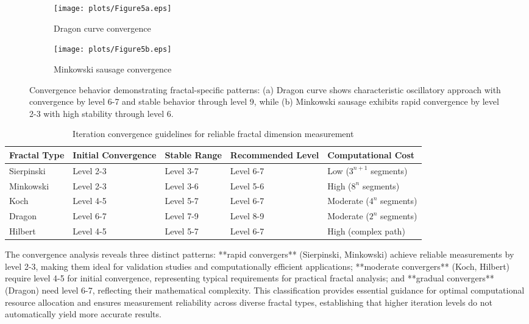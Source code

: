 \documentclass[preprint,12pt]{elsarticle}
\def\textbf#1{#1}%
\begin{document}
\begin{figure}[tbp]
\centering
\begin{subfigure}[b]{0.8\textwidth}
    \centering
    \texttt{[image: plots/Figure5a.eps]}
    \caption{Dragon curve convergence}
    \label{fig:dragon_convergence}
\end{subfigure}

\vspace{0.5cm}

\begin{subfigure}[b]{0.8\textwidth}
    \centering
    \texttt{[image: plots/Figure5b.eps]}
    \caption{Minkowski sausage convergence}
    \label{fig:minkowski_convergence}
\end{subfigure}
\caption{Convergence behavior demonstrating fractal-specific patterns: (a) Dragon curve shows characteristic oscillatory approach with convergence by level 6-7 and stable behavior through level 9, while (b) Minkowski sausage exhibits rapid convergence by level 2-3 with high stability through level 6.}
\label{fig:convergence_examples}
\end{figure}

\begin{table}[H]
\centering
\small
\begin{tabularx}{\textwidth}{@{}lXXXX@{}}
\toprule
\textbf{Fractal Type} & \textbf{Initial Convergence} & \textbf{Stable Range} & \textbf{Recommended Level} & \textbf{Computational Cost} \\
\midrule
Sierpinski & Level 2-3 & Level 3-7 & Level 6-7 & Low ($3^{n+1}$ segments) \\
Minkowski & Level 2-3 & Level 3-6 & Level 5-6 & High ($8^n$ segments) \\
Koch & Level 4-5 & Level 5-7 & Level 6-7 & Moderate ($4^n$ segments) \\
Dragon & Level 6-7 & Level 7-9 & Level 8-9 & Moderate ($2^n$ segments) \\
Hilbert & Level 4-5 & Level 5-7 & Level 6-7 & High (complex path) \\
\bottomrule
\end{tabularx}
\caption{Iteration convergence guidelines for reliable fractal dimension measurement}
\label{tab:convergence_guidelines}
\end{table}

The convergence analysis reveals three distinct patterns: **rapid convergers** (Sierpinski, Minkowski) achieve reliable measurements by level 2-3, making them ideal for validation studies and computationally efficient applications; **moderate convergers** (Koch, Hilbert) require level 4-5 for initial convergence, representing typical requirements for practical fractal analysis; and **gradual convergers** (Dragon) need level 6-7, reflecting their mathematical complexity. This classification provides essential guidance for optimal computational resource allocation and ensures measurement reliability across diverse fractal types, establishing that higher iteration levels do not automatically yield more accurate results.
\end{document}
